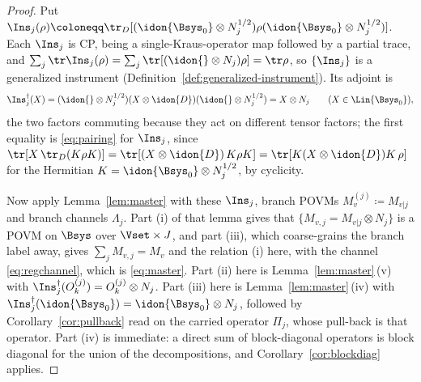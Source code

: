 \begin{proof}
Put $\Ins_j(\rho)\coloneqq\tr_{D}[(\idon{\Bsys_0}\otimes N_j^{1/2})\rho
(\idon{\Bsys_0}\otimes N_j^{1/2})]$. Each $\Ins_j$ is CP, being a
single-Kraus-operator map followed by a partial trace, and
$\sum_j\tr\Ins_j(\rho)=\sum_j\tr[(\idon{}\otimes N_j)\rho]=\tr\rho$, so
$\{\Ins_j\}$ is a generalized instrument
(Definition~\ref{def:generalized-instrument}). Its adjoint is
\begin{equation*}
  \Ins_j^{\dagger}(X)
  =(\idon{}\otimes N_j^{1/2})(X\otimes\idon{D})(\idon{}\otimes N_j^{1/2})
  =X\otimes N_j
  \qquad(X\in\Lin{\Bsys_0}),
\end{equation*}
the two factors commuting because they act on different tensor factors; the
first equality is \eqref{eq:pairing} for $\Ins_j$, since
$\tr[X\,\tr_D(K\rho K)]=\tr[(X\otimes\idon{D})\,K\rho K]
=\tr[K(X\otimes\idon{D})K\,\rho]$ for the Hermitian
$K=\idon{\Bsys_0}\otimes N_j^{1/2}$, by cyclicity.

Now apply Lemma~\ref{lem:master} with these $\Ins_j$, branch POVMs
$M^{(j)}_v\coloneqq M_{v|j}$ and branch channels $\Lambda_j$. Part (i) of that
lemma gives that $\{M_{v,j}=M_{v|j}\otimes N_j\}$ is a POVM on $\Bsys$ over
$\Vset\times J$, and part (iii), which coarse-grains the branch label away,
gives $\sum_jM_{v,j}=M_v$ and the relation (i) here, with the channel
\eqref{eq:regchannel}, which is \eqref{eq:master}. Part (ii) here is
Lemma~\ref{lem:master}\,(v) with $\Ins_j^{\dagger}(O^{(j)}_k)=O^{(j)}_k\otimes
N_j$. Part (iii) here is Lemma~\ref{lem:master}\,(iv) with
$\Ins_j^{\dagger}(\idon{\Bsys_0})=\idon{\Bsys_0}\otimes N_j$, followed by
Corollary~\ref{cor:pullback} read on the carried operator $\Pi_j$, whose
pull-back is that operator. Part (iv) is immediate: a direct sum of
block-diagonal operators is block diagonal for the union of the
decompositions, and Corollary~\ref{cor:blockdiag} applies.
\end{proof}
